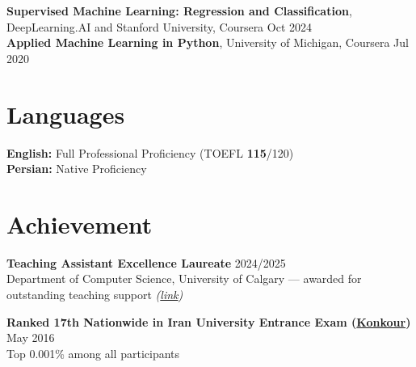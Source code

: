 \documentclass[a4paper,10pt]{article}
\begin{document}
\textbf{Supervised Machine Learning: Regression and Classification}, DeepLearning.AI and Stanford University, Coursera \hfill Oct 2024 \\
\textbf{Applied Machine Learning in Python}, University of Michigan, Coursera \hfill Jul 2020

\section*{Languages}

\textbf{English:} Full Professional Proficiency (TOEFL \textbf{115}/120) \\
\textbf{Persian:} Native Proficiency

\section*{Achievement}

\textbf{Teaching Assistant Excellence Laureate} \hfill 2024/2025 \\
Department of Computer Science, University of Calgary --- awarded for outstanding teaching support \textit{(\href{https://science.ucalgary.ca/computer-science/about/our-department/ta-recognition-2024-2025}{link})}

\vspace{0.35em}

\textbf{Ranked 17th Nationwide in Iran University Entrance Exam (\href{https://en.wikipedia.org/wiki/Iranian_University_Entrance_Exam}{Konkour})} \hfill May 2016 \\
Top 0.001\% among all participants
\end{document}
